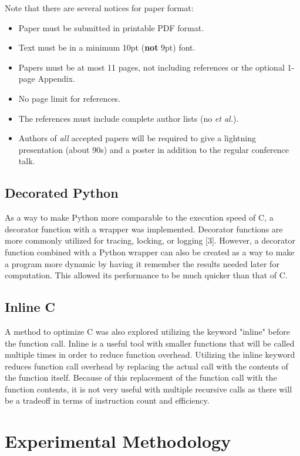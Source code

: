 \documentclass{sig-alternate}
\begin{document}
 Note that there are several notices for paper format:
\begin{itemize}
\item Paper must be submitted in printable PDF format.
\item Text must be in a minimum 10pt ({\bf not} 9pt) font.
\item Papers must be at most 11 pages, not including references or the optional 1-page Appendix.
\item No page limit for references.
\item The references must include complete author lists (no {\em et al.}).
\item Authors of {\em all} accepted papers will be required to give a lightning presentation (about 90s) and a poster in addition to the regular conference talk.
\end{itemize}


\subsection{Decorated Python}

As a way to make Python more comparable to the execution speed of C, a decorator function with a wrapper was implemented. Decorator functions are more commonly utilized for tracing, locking, or logging [3]. However, a decorator function combined with a Python wrapper can also be created as a way to make a program more dynamic by having it remember the results needed later for computation. This allowed its performance to be much quicker than that of C.

\subsection{Inline C}

A method to optimize C was also explored utilizing the keyword "inline" before the function call. Inline is a useful tool with smaller functions that will be called multiple times in order to reduce function overhead. Utilizing the inline keyword reduces function call overhead by replacing the actual call with the contents of the function itself. Because of this replacement of the function call with the function contents, it is not very useful with multiple recursive calls as there will be a tradeoff in terms of instruction count and efficiency.

\section{Experimental Methodology}
\end{document}
